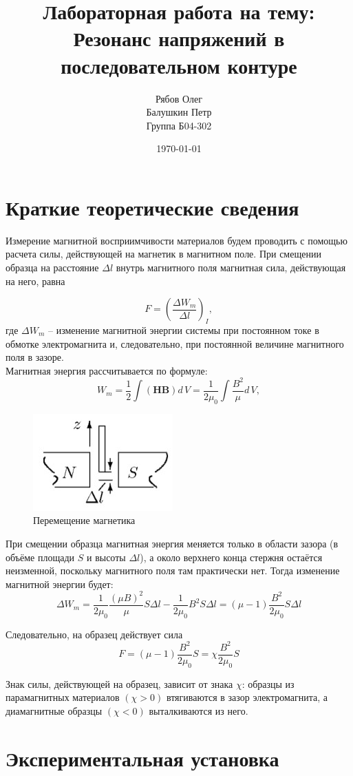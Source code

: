 \documentclass[a4paper, 12pt]{article}
\title{Лабораторная работа на тему: \\    
    Резонанс напряжений в последовательном контуре
    }
\author{Рябов Олег \\
    Балушкин Петр\\
    Группа Б04-302}
\date{\today}
\begin{document}
	\section*{Краткие теоретические сведения}
	Измерение магнитной восприимчивости материалов будем проводить с помощью расчета силы, действующей на магнетик в магнитном поле. При смещении образца на расстояние $ \Delta l $ внутрь магнитного поля магнитная сила, действующая на него, равна
	
	\begin{equation}
		F = \left(\frac{\Delta W_m}{\Delta l}\right)_I,
	\end{equation}
	где $ \Delta W_m $ -- изменение магнитной энергии системы при постоянном токе
	в обмотке электромагнита и, следовательно, при постоянной величине
	магнитного поля в зазоре.\\
	Магнитная энергия рассчитывается по формуле:
	\[W_m=\frac{1}{2}\int (\mathbf{H}\mathbf{B})d\,V = \frac{1}{2\mu_0}\int\frac{B^2}{\mu}d\,V,\]
	\begin{figure}
		\centering
		\includegraphics[height = 0.12\textheight]{pictures/energy.jpg}
		\caption{Перемещение магнетика}
	\end{figure}
	

	 При смещении образца магнитная энергия меняется только в области зазора (в объёме площади $ S $ и высоты $ \Delta l $), а около верхнего конца стержня остаётся неизменной, поскольку магнитного поля там практически нет. Тогда изменение магнитной энергии будет:
	\[\Delta W_m=\frac{1}{2\mu_0}\frac{(\mu B)^2}{\mu}S\Delta l - \frac{1}{2\mu_0}B^2 S\Delta l = (\mu - 1) \frac{B^2}{2\mu_0}S\Delta l \]
	
	Следовательно, на образец действует сила
	\[F = (\mu - 1)\frac{B^2}{2\mu_0}S = \chi\frac{B^2}{2\mu_0}S\]
	
	Знак силы, действующей на образец, зависит от знака $ \chi $: образцы из парамагнитных материалов $( \chi  > 0)$ втягиваются в зазор электромагнита, а диамагнитные образцы $ (\chi < 0) $ выталкиваются из него.
	
	\section*{Экспериментальная установка}
	
\end{document}
